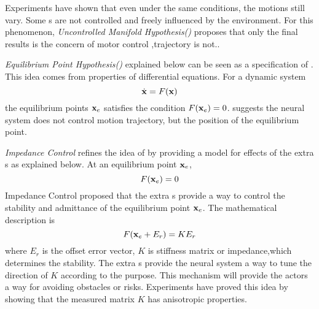 Experiments have shown that even under the same conditions, the motions still vary. 
Some \dof s are not controlled and freely influenced by the environment. 
For this phenomenon, \emph{Uncontrolled Manifold Hypothesis(\umh)}\citep{latash2008neurophysiological} proposes that only the final results is the concern of motor control ,trajectory is not..


\emph{Equilibrium Point Hypothesis(\eph)}\citep{feldman1986ome} explained below can be seen as a specification of \umh.
This idea comes from properties of differential equations. 
For a dynamic system
\[
\dot{\mathbf{x}}=F(\mathbf{x})
\]
the equilibrium points $\mathbf{x}_{e}$ satisfies the condition $F(\mathbf{x}_{e})=0$.
\eph suggests the neural system does not control motion trajectory, but the position of the equilibrium point.



\emph{Impedance Control} \citep{hogan1985ica} refines the idea of \eph by providing a model for effects of the extra \dof s as explained below. 
At an equilibrium point $\mathbf{x}_{e}$,
\[
F(\mathbf{x}_{e})=0 
\]
Impedance Control proposed that the extra \dof s provide a way to control the stability and admittance of the equilibrium point $\mathbf{x}_{e}$. 
The mathematical description is
\begin{equation}
F(\mathbf{x}_{e}+E_r)=KE_r
\end{equation}
where $E_r$ is the offset error vector, $K$ is stiffness matrix or impedance,which determines the stability.
The extra \dof s provide the neural system  a way to tune the direction of $K$ according to the purpose.
This mechanism will provide the actors a way for avoiding obstacles or risks. 
Experiments \citep{Franklin2007} have proved this idea by showing  that the measured matrix $K$ has anisotropic properties.







